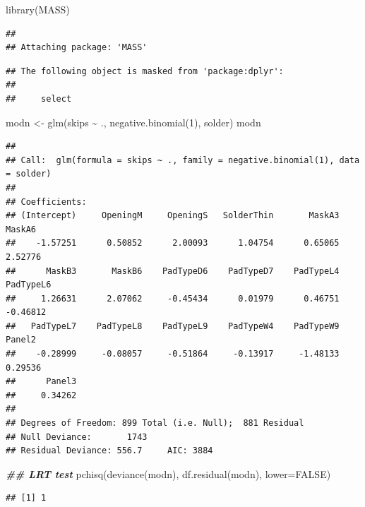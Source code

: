 \documentclass[
  ignorenonframetext,
]{beamer}
\newenvironment{Shaded}{\begin{snugshade}}{\end{snugshade}}
\newcommand{\AttributeTok}[1]{\textcolor[rgb]{0.77,0.63,0.00}{#1}}
\newcommand{\ConstantTok}[1]{\textcolor[rgb]{0.00,0.00,0.00}{#1}}
\newcommand{\DecValTok}[1]{\textcolor[rgb]{0.00,0.00,0.81}{#1}}
\newcommand{\DocumentationTok}[1]{\textcolor[rgb]{0.56,0.35,0.01}{\textbf{\textit{#1}}}}
\newcommand{\FunctionTok}[1]{\textcolor[rgb]{0.00,0.00,0.00}{#1}}
\newcommand{\NormalTok}[1]{#1}
\newcommand{\OtherTok}[1]{\textcolor[rgb]{0.56,0.35,0.01}{#1}}
\newcommand{\SpecialCharTok}[1]{\textcolor[rgb]{0.00,0.00,0.00}{#1}}
\begin{document}
\begin{frame}[fragile]{}
\protect\hypertarget{section-25}{}
\tiny

\begin{Shaded}
\begin{Highlighting}[]
\FunctionTok{library}\NormalTok{(MASS)}
\end{Highlighting}
\end{Shaded}

\begin{verbatim}
## 
## Attaching package: 'MASS'
\end{verbatim}

\begin{verbatim}
## The following object is masked from 'package:dplyr':
## 
##     select
\end{verbatim}

\begin{Shaded}
\begin{Highlighting}[]
\NormalTok{modn }\OtherTok{\textless{}{-}} \FunctionTok{glm}\NormalTok{(skips }\SpecialCharTok{\textasciitilde{}}\NormalTok{ ., }\FunctionTok{negative.binomial}\NormalTok{(}\DecValTok{1}\NormalTok{), solder)}
\NormalTok{modn}
\end{Highlighting}
\end{Shaded}

\begin{verbatim}
## 
## Call:  glm(formula = skips ~ ., family = negative.binomial(1), data = solder)
## 
## Coefficients:
## (Intercept)     OpeningM     OpeningS   SolderThin       MaskA3       MaskA6  
##    -1.57251      0.50852      2.00093      1.04754      0.65065      2.52776  
##      MaskB3       MaskB6    PadTypeD6    PadTypeD7    PadTypeL4    PadTypeL6  
##     1.26631      2.07062     -0.45434      0.01979      0.46751     -0.46812  
##   PadTypeL7    PadTypeL8    PadTypeL9    PadTypeW4    PadTypeW9       Panel2  
##    -0.28999     -0.08057     -0.51864     -0.13917     -1.48133      0.29536  
##      Panel3  
##     0.34262  
## 
## Degrees of Freedom: 899 Total (i.e. Null);  881 Residual
## Null Deviance:       1743 
## Residual Deviance: 556.7     AIC: 3884
\end{verbatim}

\begin{Shaded}
\begin{Highlighting}[]
\DocumentationTok{\#\# LRT test}
\FunctionTok{pchisq}\NormalTok{(}\FunctionTok{deviance}\NormalTok{(modn), }\FunctionTok{df.residual}\NormalTok{(modn), }\AttributeTok{lower=}\ConstantTok{FALSE}\NormalTok{)}
\end{Highlighting}
\end{Shaded}

\begin{verbatim}
## [1] 1
\end{verbatim}
\end{frame}
\end{document}
